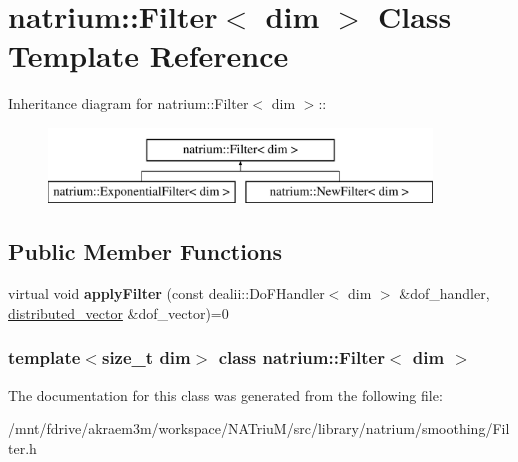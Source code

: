 \hypertarget{classnatrium_1_1Filter}{
\section{natrium::Filter$<$ dim $>$ Class Template Reference}
\label{classnatrium_1_1Filter}
}
Inheritance diagram for natrium::Filter$<$ dim $>$::\begin{figure}[H]
\begin{center}
\leavevmode
\includegraphics[height=2cm]{classnatrium_1_1Filter}
\end{center}
\end{figure}
\subsection*{Public Member Functions}
\begin{DoxyCompactItemize}
\item 
\hypertarget{classnatrium_1_1Filter_a920cda92bccd24d0a5c8247f4d89d45a}{
virtual void {\bfseries applyFilter} (const dealii::DoFHandler$<$ dim $>$ \&dof\_\-handler, \hyperlink{namespacenatrium_a903d2b92917f582f2ff05f52160ab811}{distributed\_\-vector} \&dof\_\-vector)=0}
\label{classnatrium_1_1Filter_a920cda92bccd24d0a5c8247f4d89d45a}

\end{DoxyCompactItemize}
\subsubsection*{template$<$size\_\-t dim$>$ class natrium::Filter$<$ dim $>$}



The documentation for this class was generated from the following file:\begin{DoxyCompactItemize}
\item 
/mnt/fdrive/akraem3m/workspace/NATriuM/src/library/natrium/smoothing/Filter.h\end{DoxyCompactItemize}

